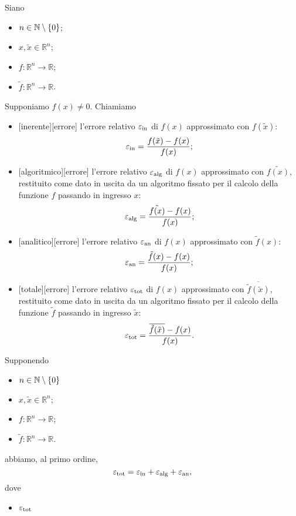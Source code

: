 \begin{Definition}
  Siano
  \begin{itemize}
    \item $n \in \mathbb{N} \setminus \lbrace 0 \rbrace$;
    \item $x, \tilde{x} \in \mathbb{R}^n$;
    \item $f: \mathbb{R}^n \rightarrow \mathbb{R}$;
    \item $\tilde{f}: \mathbb{R}^n \rightarrow \mathbb{R}$.
  \end{itemize}
  Supponiamo $f(x) \neq 0$.
  Chiamiamo
  \begin{itemize}
    \item {}[inerente][errore]
      l'errore relativo $\varepsilon_{\text{in}}$ di $f(x)$ approssimato con
      $f(\tilde{x})$:
      \[
        \varepsilon_{\text{in}} = \frac{f(\tilde{x}) - f(x)}{f(x)};
      \]
    \item {}[algoritmico][errore]
      l'errore relativo $\varepsilon_{\text{alg}}$ di $f(x)$ approssimato con
      $\tilde{f(x)}$, restituito come dato in uscita da un algoritmo
      fissato per il calcolo della funzione $f$ passando in ingresso $x$:
      \[
        \varepsilon_{\text{alg}} = \frac{\tilde{f(x)} - f(x)}{f(x)};
      \]
    \item {}[analitico][errore]
      l'errore relativo $\varepsilon_{\text{an}}$ di $f(x)$ approssimato con
      $\tilde{f}(x)$:
      \[
        \varepsilon_{\text{an}} = \frac{\tilde{f}(x) - f(x)}{f(x)};
      \]
    \item {}[totale][errore]
      l'errore relativo $\varepsilon_{\text{tot}}$ di $f(x)$ approssimato con
      $\overline{\tilde{f}(\tilde{x})}$, restituito come dato in uscita da un
      algoritmo fissato per il calcolo della funzione $\tilde{f}$ passando in 
      ingresso $\tilde{x}$:
      \[
        \varepsilon_{\text{tot}} = \frac{\overline{\tilde{f}(\tilde{x})} - f(x)}{f(x)}.
      \]
  \end{itemize}
\end{Definition}
\begin{Theorem}
  Supponendo
  \begin{itemize}
    \item $n \in \mathbb{N} \setminus \lbrace 0 \rbrace$
    \item $x, \tilde{x} \in \mathbb{R}^n$;
    \item $f: \mathbb{R}^n \rightarrow \mathbb{R}$;
    \item $\tilde{f}: \mathbb{R}^n \rightarrow \mathbb{R}$.
  \end{itemize}
  abbiamo, al primo ordine,
  \[
    \varepsilon_{\text{tot}} = \varepsilon_{\text{in}} + \varepsilon_{\text{alg}} + \varepsilon_{\text{an}},
  \]
  dove
  \begin{itemize}
    \item $\varepsilon_{\text{tot}}$ 
  \end{itemize}
\end{Theorem}
